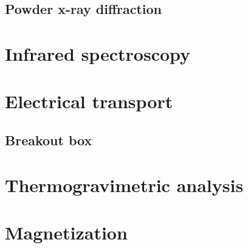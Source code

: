 \subsection{Powder x-ray diffraction}
\section{Infrared spectroscopy}
\section{Electrical transport}
\subsection{Breakout box}
\section{Thermogravimetric analysis}
\section{Magnetization}